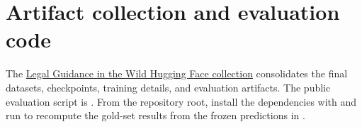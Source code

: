 \documentclass[11pt]{article}
\begin{document}
\section{Artifact collection and evaluation code}

The \href{https://huggingface.co/collections/AmirMohseni/legal-guidance-in-the-wild}{Legal Guidance in the Wild Hugging Face collection} consolidates the final datasets, checkpoints, training details, and evaluation artifacts. The public evaluation script is . From the repository root, install the dependencies with  and run  to recompute the gold-set results from the frozen predictions in .
\end{document}
